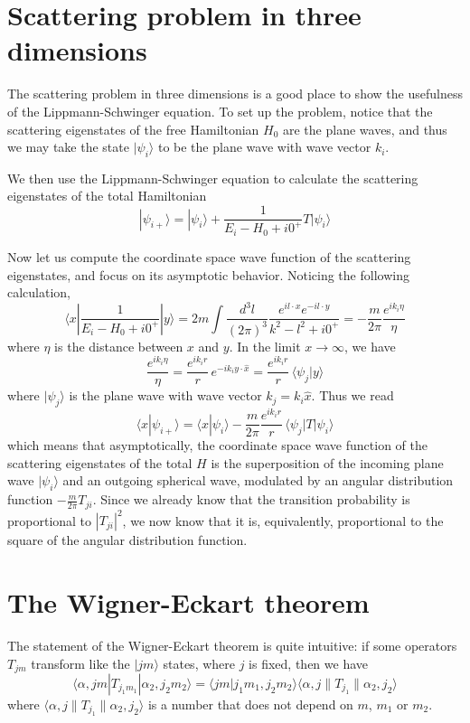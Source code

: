 \documentclass[12pt, oneside]{book}
\begin{document}
\section*{Scattering problem in three dimensions}
The scattering problem in three dimensions is a good place to show the usefulness of the Lippmann-Schwinger equation. To set up the problem, notice that the scattering eigenstates of the free Hamiltonian $H_0$ are the plane waves, and thus we may take the state $|\psi_i\rangle$ to be the plane wave with wave vector $k_i$.

We then use the Lippmann-Schwinger equation to calculate the scattering eigenstates of the total Hamiltonian
\[
|\psi_{i+}\rangle=|\psi_i\rangle+\frac1{E_i-H_0+i0^+}T|\psi_i\rangle
\]

Now let us compute the coordinate space wave function of the scattering eigenstates, and focus on its asymptotic behavior. Noticing the following calculation,
\[
\langle x|\frac1{E_i-H_0+i0^+}|y\rangle=2m\int\frac{d^3l}{(2\pi)^3}\frac{e^{il\cdot x}e^{-il\cdot y}}{k^2-l^2+i0^+}=-\frac{m}{2\pi}\frac{e^{ik_i\eta}}{\eta}
\]
where $\eta$ is the distance between $x$ and $y$. In the limit $x\to\infty$, we have
\[
\frac{e^{ik_i\eta}}{\eta}=\frac{e^{ik_ir}}{r}\,e^{-ik_iy\cdot\hat{x}}=\frac{e^{ik_ir}}{r}\,\langle\psi_j|y\rangle
\]
where $|\psi_j\rangle$ is the plane wave with wave vector $k_j=k_i\hat{x}$. Thus we read
\[
\langle x|\psi_{i+}\rangle=\langle x|\psi_i\rangle-\frac{m}{2\pi}\frac{e^{ik_ir}}{r}\,\langle\psi_j|T|\psi_i\rangle
\]
which means that asymptotically, the coordinate space wave function of the scattering eigenstates of the total $H$ is the superposition of the incoming plane wave $|\psi_i\rangle$ and an outgoing spherical wave, modulated by an angular distribution function $-\frac{m}{2\pi}T_{ji}$. Since we already know that the transition probability is proportional to $|T_{ji}|^2$, we now know that it is, equivalently, proportional to the square of the angular distribution function.

\section*{The Wigner-Eckart theorem}
The statement of the Wigner-Eckart theorem is quite intuitive: if some operators $T_{jm}$ transform like the $|jm\rangle$ states, where $j$ is fixed, then we have
\[
\langle\alpha,jm|T_{j_1m_1}|\alpha_2,j_2m_2\rangle=\langle jm|j_1m_1,j_2m_2\rangle\langle\alpha,j\|T_{j_1}\|\alpha_2,j_2\rangle
\]
where $\langle\alpha,j\|T_{j_1}\|\alpha_2,j_2\rangle$ is a number that does not depend on $m$, $m_1$ or $m_2$.
\end{document}
